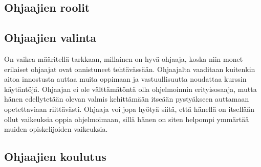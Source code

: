 \documentclass[finnish]{tktltiki2}
\theoremstyle{definition}
\theoremstyle{remark}
\begin{document}
\subsection{Ohjaajien roolit}




\subsection{Ohjaajien valinta}
On vaikea määritellä tarkkaan, millainen on hyvä ohjaaja, koska niin monet erilaiset ohjaajat ovat onnistuneet tehtävässään. Ohjaajalta vaaditaan kuitenkin aitoa innostusta auttaa muita oppimaan ja vastuullisuutta noudattaa kurssin käytäntöjä. Ohjaajan ei ole välttämätöntä olla ohjelmoinnin erityisosaaja, mutta hänen edellytetään olevan valmis kehittämään itseään pystyäkseen auttamaan opetettaviaan riittävästi.\cite{Reges88} Ohjaaja voi jopa hyötyä siitä, että hänellä on itsellään ollut vaikeuksia oppia ohjelmoimaan, sillä hänen on siten helpompi ymmärtää muiden opiskelijoiden vaikeuksia.\cite{Decker06}



\subsection{Ohjaajien koulutus}

\end{document}
